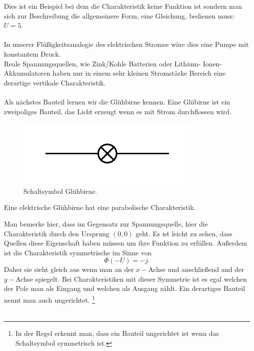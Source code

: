 \documentclass[11pt,a4paper,leqno]{report}
\numberwithin{equation}{chapter}
\begin{document}
\noindent
Dies ist ein Beispiel bei dem die Charakteristik keine Funktion ist sondern man sich zur Beschreibung die allgemeinere Form, eine Gleichung, bedienen muss: $U=5$.\\
\\
In unserer Fl\"u\ss{}igkeitsanalogie des elektrischen Stromes w\"are dies eine Pumpe mit konstantem Druck.\\
Reale Spannungsquellen, wie Zink/Kohle Batterien oder Lithium- Ionen- Akkumulatoren haben nur in einem sehr kleinen Stromst\"arke Bereich eine derartige vertikale Charakteristik.\\
\\
Als n\"achstes Bauteil lernen wir die Gl\"uhbirne kennen. Eine Gl\"ubirne ist ein zweipoliges Bauteil, das Licht erzeugt wenn es mit Strom durchflossen wird.
\begin{figure}[H]
	\begin{center}
		\includegraphics[scale=1]{Bilder/gluh.pdf}
		\caption{Schaltsymbol Gl\"uhbirne.}
	\end{center}
\end{figure}
\noindent
Eine elektrische Gl\"uhbirne hat eine parabolische Charakteristik.
\begin{figure}[H]
\end{figure}
\noindent
Man bemerke hier, dass im Gegensatz zur Spannungsquelle, hier die Charakteristik durch den Ursprung $(0,0)$ geht. Es ist leicht zu sehen, dass Quellen diese Eigenschaft haben m\"ussen um ihre Funktion zu erf\"ullen. Au\ss{}erdem ist die Charakteristik symmetrische im Sinne von 
\begin{equation*}
	\Phi(-U) = - j.
\end{equation*}
Daher sie sieht gleich aus wenn man an der $x-$Achse und anschlie\ss{}end and der $y-$Achse spiegelt. Bei Charakteristiken mit dieser Symmetrie ist es egal welchen der Pole man als Eingang und welchen als Ausgang z\"ahlt. Ein derartiges Bauteil nennt man auch ungerichtet. \footnote{In der Regel erkennt man, dass ein Bauteil ungerichtet ist wenn das Schaltsymbol symmetrisch ist.}
\\
\\
\end{document}
